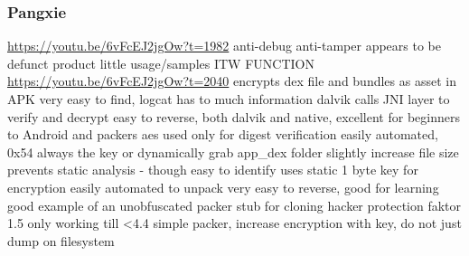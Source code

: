 \subsubsection{Pangxie}
\url{https://youtu.be/6vFcEJ2jgOw?t=1982}\newline
anti-debug\newline
anti-tamper\newline
appears to be defunct product\newline
little usage/samples ITW\newline
FUNCTION\newline
\url{https://youtu.be/6vFcEJ2jgOw?t=2040}\newline
encrypts dex file and bundles as asset in APK\newline
very easy to find, logcat has to much information\newline
dalvik calls JNI layer to verify and decrypt\newline
easy to reverse, both dalvik and native, excellent for beginners to Android and packers\newline
aes used only for digest verification\newline
easily automated, 0x54 always the key\newline
or dynamically grab app\_dex folder\newline
slightly increase file size\newline
prevents static analysis - though easy to identify\newline
uses static 1 byte key for encryption\newline
easily automated to unpack\newline
very easy to reverse, good for learning\newline
good example of an unobfuscated packer stub for cloning\newline
hacker protection faktor 1.5\newline
only working till <4.4\newline
simple packer, increase encryption with key, do not just dump on filesystem\newline
